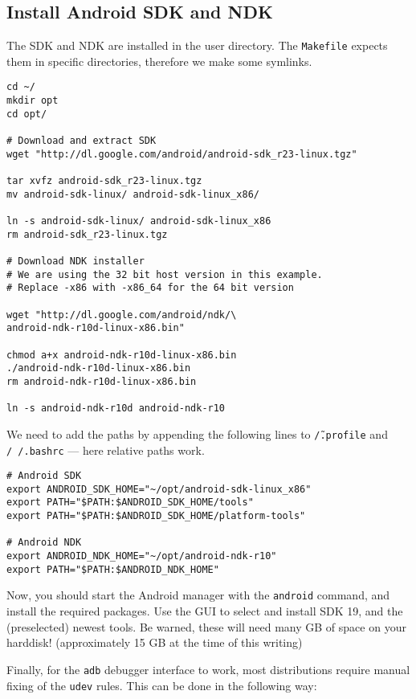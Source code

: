 \subsection{Install Android SDK and NDK}

The SDK and NDK are installed in the user directory. The \texttt{Makefile} expects them in specific directories, therefore we make some symlinks.

\begin{verbatim}
cd ~/
mkdir opt
cd opt/

# Download and extract SDK
wget "http://dl.google.com/android/android-sdk_r23-linux.tgz"

tar xvfz android-sdk_r23-linux.tgz
mv android-sdk-linux/ android-sdk-linux_x86/

ln -s android-sdk-linux/ android-sdk-linux_x86
rm android-sdk_r23-linux.tgz

# Download NDK installer
# We are using the 32 bit host version in this example.
# Replace -x86 with -x86_64 for the 64 bit version

wget "http://dl.google.com/android/ndk/\
android-ndk-r10d-linux-x86.bin"

chmod a+x android-ndk-r10d-linux-x86.bin
./android-ndk-r10d-linux-x86.bin
rm android-ndk-r10d-linux-x86.bin

ln -s android-ndk-r10d android-ndk-r10
\end{verbatim}

We need to add the paths by appending the following lines to \texttt{\~/.profile} and \texttt{/~/.bashrc} --- here relative paths work.

\begin{verbatim}
# Android SDK
export ANDROID_SDK_HOME="~/opt/android-sdk-linux_x86"
export PATH="$PATH:$ANDROID_SDK_HOME/tools"
export PATH="$PATH:$ANDROID_SDK_HOME/platform-tools"

# Android NDK
export ANDROID_NDK_HOME="~/opt/android-ndk-r10"
export PATH="$PATH:$ANDROID_NDK_HOME"
\end{verbatim}

Now, you should start the Android manager with the \texttt{android} command, and install the required packages. Use the GUI to select and install SDK 19, and the (preselected) newest tools. Be warned, these will need many GB of space on your harddisk! (approximately 15 GB at the time of this writing)

Finally, for the \texttt{adb} debugger interface to work, most distributions require manual fixing of the \texttt{udev} rules. This can be done in the following way:

